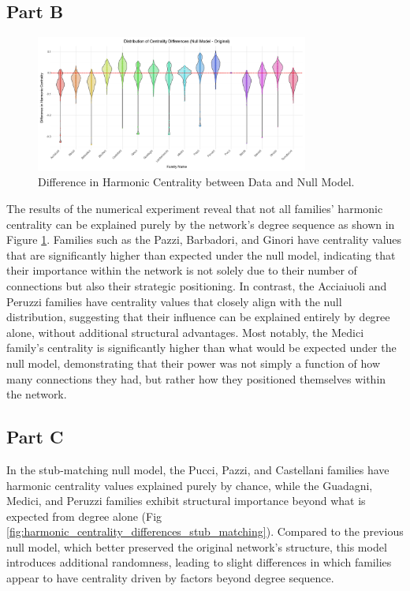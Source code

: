 \documentclass[12pt]{article}
\begin{document}
\subsection*{Part B}

\begin{figure}[h]
    \centering
    \includegraphics[width=0.8\textwidth]{../figures/centrality_differences.png}
    \caption{Difference in Harmonic Centrality between Data and Null Model.}
    \label{fig:harmonic_centrality_differences}
\end{figure}

The results of the numerical experiment reveal that not all families' harmonic centrality can be explained purely by the network’s degree sequence as shown in Figure \ref{fig:harmonic_centrality_differences}. Families such as the Pazzi, Barbadori, and Ginori have centrality values that are significantly higher than expected under the null model, indicating that their importance within the network is not solely due to their number of connections but also their strategic positioning. In contrast, the Acciaiuoli and Peruzzi families have centrality values that closely align with the null distribution, suggesting that their influence can be explained entirely by degree alone, without additional structural advantages. Most notably, the Medici family's centrality is significantly higher than what would be expected under the null model, demonstrating that their power was not simply a function of how many connections they had, but rather how they positioned themselves within the network. 

\subsection*{Part C}

In the stub-matching null model, the Pucci, Pazzi, and Castellani families have harmonic centrality values explained purely by chance, while the Guadagni, Medici, and Peruzzi families exhibit structural importance beyond what is expected from degree alone (Fig \ref{fig:harmonic_centrality_differences_stub_matching}). Compared to the previous null model, which better preserved the original network’s structure, this model introduces additional randomness, leading to slight differences in which families appear to have centrality driven by factors beyond degree sequence.
\end{document}
